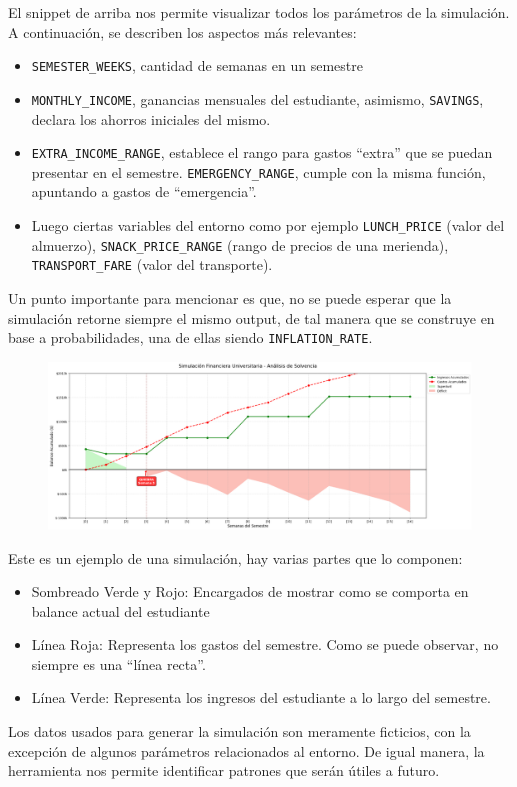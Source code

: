 \documentclass[letterpaper, 11pt]{report}
\begin{document}
El snippet de arriba nos permite visualizar todos los parámetros de la
simulación. A continuación, se describen los aspectos más relevantes:

\begin{itemize}
      \item \texttt{SEMESTER\_WEEKS}, cantidad de semanas en un semestre
      \item \texttt{MONTHLY\_INCOME}, ganancias mensuales del estudiante, asimismo, \texttt{SAVINGS}, declara los ahorros iniciales del mismo.
      \item \texttt{EXTRA\_INCOME\_RANGE}, establece el rango para gastos “extra” que se puedan presentar en el semestre. \texttt{EMERGENCY\_RANGE}, cumple con la misma función, apuntando a gastos de “emergencia”.
      \item Luego ciertas variables del entorno como por ejemplo \texttt{LUNCH\_PRICE}
            (valor del almuerzo), \texttt{SNACK\_PRICE\_RANGE} (rango de precios de una
            merienda), \texttt{TRANSPORT\_FARE} (valor del transporte).
\end{itemize}

Un punto importante para mencionar es que, no se puede esperar que la
simulación retorne siempre el mismo output, de tal manera que se construye en
base a probabilidades, una de ellas siendo \texttt{INFLATION\_RATE}.

\begin{figure}[H]
      \begin{center}
            \includegraphics[width=\linewidth]{./Images/output_sample.png}
            \caption{}
      \end{center}
\end{figure}

Este es un ejemplo de una simulación, hay varias partes que lo componen:

\begin{itemize}
      \item Sombreado Verde y Rojo: Encargados de mostrar como se comporta en balance
            actual del estudiante
      \item Línea Roja: Representa los gastos del semestre. Como se puede observar, no
            siempre es una ``línea recta''.
      \item Línea Verde: Representa los ingresos del estudiante a lo largo del semestre.
\end{itemize}

Los datos usados para generar la simulación son meramente ficticios, con la
excepción de algunos parámetros relacionados al entorno. De igual manera, la
herramienta nos permite identificar patrones que serán útiles a futuro.

\newpage
\end{document}
